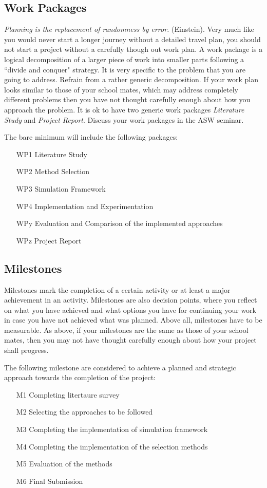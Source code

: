 \documentclass[rnd]{mas_proposal}
\begin{document}
\subsection{Work Packages}
\emph{Planning is the replacement of randomness by error.} (Einstein). Very much like you would never start a longer journey without a detailed travel plan, you should not start a project without a carefully though out work plan. A work package is a logical decomposition of a larger piece of work into smaller parts following a ``divide and conquer" strategy. It is very specific to the problem that you are going to address. Refrain from a rather generic decomposition. If your work plan looks similar to those of your school mates, which may address completely different problems then you have not thought carefully enough about how you approach the problem. It is ok to have two generic work packages \emph{Literature Study} and \emph{Project Report}. Discuss your work packages in the ASW seminar.

The bare minimum will include the following packages:
\begin{enumerate}
    \item[WP1] Literature Study
    \item[WP2] Method Selection
    \item[WP3] Simulation Framework
    \item[WP4] Implementation and Experimentation
    \item[WPy] Evaluation and Comparison of the implemented approaches
    \item[WPz] Project Report
\end{enumerate}

\subsection{Milestones}
Milestones mark the completion of a certain activity or at least a major achievement in an activity. Milestones are also decision points, where you reflect on what you have achieved and what options you have for continuing your work in case you have not achieved what was planned. Above all, milestones have to be measurable. As above, if your milestones are the same as those of your school mates, then you may not have thought carefully enough about how your project shall progress.

The following milestone are considered to achieve a planned and strategic approach towards the completion of the project:
\begin{enumerate}
    \item[M1] Completing litertaure survey
    \item[M2] Selecting the approaches to be followed
    \item[M3] Completing the implementation of simulation framework
    \item[M4] Completing the implementation of the selection methods
    \item[M5] Evaluation of the methods
    \item[M6] Final Submission
\end{enumerate}
\end{document}
